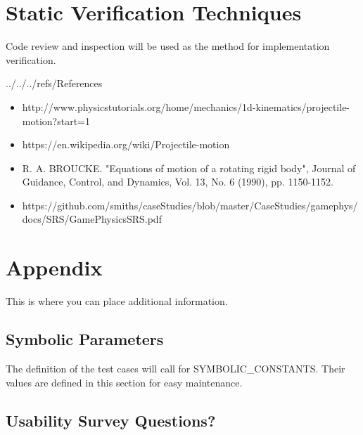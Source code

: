 \documentclass[12pt, titlepage]{article}
\begin{document}
\section{Static Verification Techniques}
Code review and inspection will be used as the method for implementation verification.




 {../../../refs/References}
\begin{itemize}
\item{http://www.physicstutorials.org/home/mechanics/1d-kinematics/projectile-motion?start=1}
\item{https://en.wikipedia.org/wiki/Projectile-motion}
\item{R. A. BROUCKE.  "Equations of motion of a rotating rigid body", Journal of Guidance, Control, and Dynamics, Vol. 13, No. 6 (1990), pp. 1150-1152.}
\item{https://github.com/smiths/caseStudies/blob/master/CaseStudies/gamephys/docs/SRS/GamePhysicsSRS.pdf}

\end{itemize}


\newpage

\section{Appendix}

This is where you can place additional information.

\subsection{Symbolic Parameters}

The definition of the test cases will call for SYMBOLIC\_CONSTANTS.
Their values are defined in this section for easy maintenance.

\subsection{Usability Survey Questions?}
\end{document}
